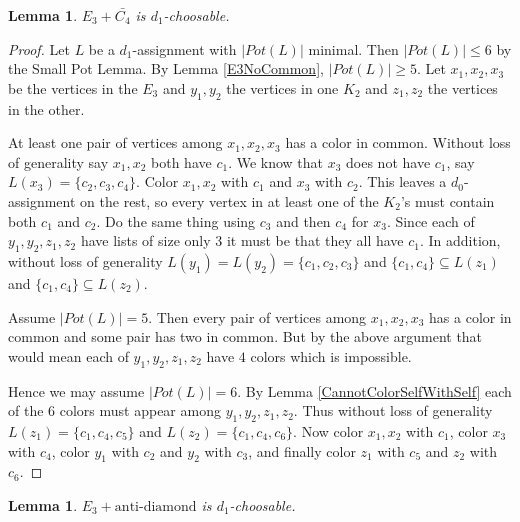 \documentclass[12pt]{article}
\theoremstyle{plain}
\newtheorem{lem}[thm]{Lemma}
\theoremstyle{definition}
\theoremstyle{remark}
\begin{document}
\begin{lem}\label{E3PlusC4Bar}
$E_3 + \bar{C_4}$ is $d_1$-choosable.
\end{lem}
\begin{proof}
Let $L$ be a $d_1$-assignment with $|Pot(L)|$ minimal. Then $|Pot(L)| \leq 6$ by the Small Pot Lemma.  By Lemma \ref{E3NoCommon}, $|Pot(L)| \geq 5$.  Let $x_1, x_2, x_3$ be the vertices in the $E_3$ and $y_1, y_2$ the vertices in one $K_2$ and $z_1, z_2$ the vertices in the other.\newline

At least one pair of vertices among $x_1, x_2, x_3$ has a color in common.  Without loss of generality say $x_1, x_2$ both have $c_1$.  We know that $x_3$ does not have $c_1$, say $L(x_3) = \{c_2, c_3, c_4\}$.  Color $x_1, x_2$ with $c_1$ and $x_3$ with $c_2$.  This leaves a $d_0$-assignment on the rest, so every vertex in at least one of the $K_2$'s must contain both $c_1$ and $c_2$.  Do the same thing using $c_3$ and then $c_4$ for $x_3$.  Since each of $y_1, y_2, z_1, z_2$ have lists of size only $3$ it must be that they all have $c_1$.  In addition, without loss of generality $L(y_1) = L(y_2) = \{c_1, c_2, c_3\}$ and $\{c_1, c_4\} \subseteq L(z_1)$ and $\{c_1, c_4\} \subseteq L(z_2)$.\newline

Assume $|Pot(L)| = 5$.  Then every pair of vertices among $x_1, x_2, x_3$ has a color in common and some pair has two in common.  But by the above argument that would mean each of $y_1, y_2, z_1, z_2$ have $4$ colors which is impossible.\newline

Hence we may assume $|Pot(L)| = 6$.  By Lemma \ref{CannotColorSelfWithSelf} each of the $6$ colors must appear among $y_1, y_2, z_1, z_2$.  Thus without loss of generality $L(z_1) = \{c_1, c_4, c_5\}$ and $L(z_2) = \{c_1, c_4, c_6\}$.  Now color $x_1, x_2$ with $c_1$, color $x_3$ with $c_4$, color $y_1$ with $c_2$ and $y_2$ with $c_3$, and finally color $z_1$ with $c_5$ and $z_2$ with $c_6$.

\end{proof}
\begin{lem}\label{E3PlusDiamondBar}
$E_3 + \text{anti-diamond}$ is $d_1$-choosable.
\end{lem}
\end{document}
